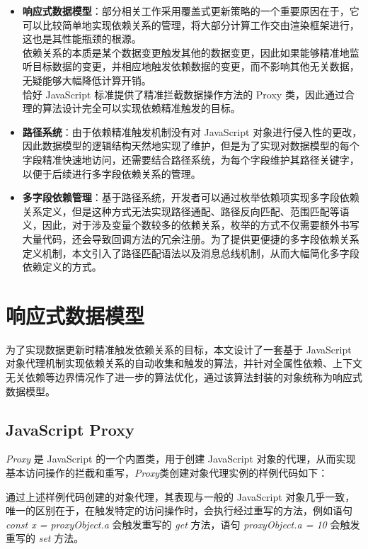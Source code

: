 \documentclass[winfonts,master,twoside]{njuthesis}
\begin{document}
\begin{itemize}
    \item \textbf{响应式数据模型}：部分相关工作采用覆盖式更新策略的一个重要原因在于，它可以比较简单地实现依赖关系的管理，将大部分计算工作交由渲染框架进行，这也是其性能瓶颈的根源。\\ 依赖关系的本质是某个数据变更触发其他的数据变更，因此如果能够精准地监听目标数据的变更，并相应地触发依赖数据的变更，而不影响其他无关数据，无疑能够大幅降低计算开销。\\ 恰好 JavaScript 标准提供了精准拦截数据操作方法的 Proxy 类，因此通过合理的算法设计完全可以实现依赖精准触发的目标。
    \item \textbf{路径系统}：由于依赖精准触发机制没有对 JavaScript 对象进行侵入性的更改，因此数据模型的逻辑结构天然地实现了维护，但是为了实现对数据模型的每个字段精准快速地访问，还需要结合路径系统，为每个字段维护其路径关键字，以便于后续进行多字段依赖关系的管理。
    \item \textbf{多字段依赖管理}：基于路径系统，开发者可以通过枚举依赖项实现多字段依赖关系定义，但是这种方式无法实现路径通配、路径反向匹配、范围匹配等语义，因此，对于涉及变量个数较多的依赖关系，枚举的方式不仅需要额外书写大量代码，还会导致回调方法的冗余注册。为了提供更便捷的多字段依赖关系定义机制，本文引入了路径匹配语法以及消息总线机制，从而大幅简化多字段依赖定义的方式。
\end{itemize}

\section{响应式数据模型}

为了实现数据更新时精准触发依赖关系的目标，本文设计了一套基于 JavaScript 对象代理机制实现依赖关系的自动收集和触发的算法，并针对全属性依赖、上下文无关依赖等边界情况作了进一步的算法优化，通过该算法封装的对象统称为响应式数据模型。

\subsection{JavaScript Proxy}

\textit{Proxy} 是 JavaScript 的一个内置类，用于创建 JavaScript 对象的代理，从而实现基本访问操作的拦截和重写，\textit{Proxy}类创建对象代理实例的样例代码如下：



通过上述样例代码创建的对象代理，其表现与一般的 JavaScript 对象几乎一致，唯一的区别在于，在触发特定的访问操作时，会执行经过重写的方法，例如语句 \textit{const x = proxyObject.a} 会触发重写的 \textit{get} 方法，语句 \textit{proxyObject.a = 10} 会触发重写的 \textit{set} 方法。
\end{document}
